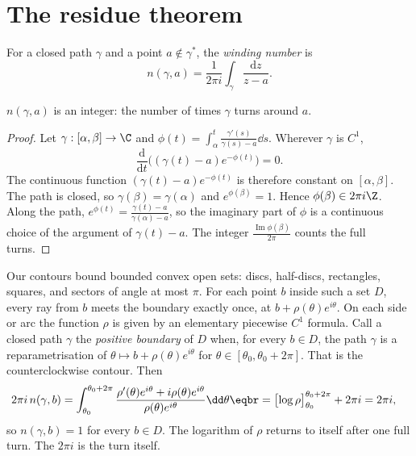 \section{The residue theorem}

For a closed path $\gamma$ and a point $a\notin\gamma^*$, the \emph{winding number} is
\[
n(\gamma,a)=\frac1{2\pi i}\int_\gamma\frac{\mathrm dz}{z-a}.
\]

\begin{proposition}\label{prop:winding}
$n(\gamma,a)$ is an integer: the number of times $\gamma$ turns around $a$.
\end{proposition}
\begin{proof}
Let $\gamma:[\alpha,\beta]\to\C$ and $\phi(t)=\int_\alpha^t\frac{\gamma'(s)}{\gamma(s)-a}\dd s$. Wherever $\gamma$ is $C^1$,
\[
\frac{\mathrm d}{\mathrm dt}\bigl((\gamma(t)-a)e^{-\phi(t)}\bigr)=0.
\]
The continuous function $(\gamma(t)-a)e^{-\phi(t)}$ is therefore constant on $[\alpha,\beta]$. The path is closed, so $\gamma(\beta)=\gamma(\alpha)$ and $e^{\phi(\beta)}=1$. Hence $\phi(\beta)\in2\pi i\Z$. Along the path, $e^{\phi(t)}=\frac{\gamma(t)-a}{\gamma(\alpha)-a}$, so the imaginary part of $\phi$ is a continuous choice of the argument of $\gamma(t)-a$. The integer $\frac{\operatorname{Im}\phi(\beta)}{2\pi}$ counts the full turns.
\end{proof}

Our contours bound bounded convex open sets: discs, half-discs, rectangles, squares, and sectors of angle at most $\pi$. For each point $b$ inside such a set $D$, every ray from $b$ meets the boundary exactly once, at $b+\rho(\theta)e^{i\theta}$. On each side or arc the function $\rho$ is given by an elementary piecewise $C^1$ formula. Call a closed path $\gamma$ the \emph{positive boundary} of $D$ when, for every $b\in D$, the path $\gamma$ is a reparametrisation of $\theta\mapsto b+\rho(\theta)e^{i\theta}$ for $\theta\in[\theta_0,\theta_0+2\pi]$. That is the counterclockwise contour. Then
\[
\begin{aligned}2\pi i\,n(\gamma,b)&=\int_{\theta_0}^{\theta_0+2\pi}\frac{\rho'(\theta)e^{i\theta}+i\rho(\theta)e^{i\theta}}{\rho(\theta)e^{i\theta}}\dd\theta\eqbr=\bigl[\log\rho\bigr]_{\theta_0}^{\theta_0+2\pi}+2\pi i=2\pi i,\end{aligned}
\]
so $n(\gamma,b)=1$ for every $b\in D$. The logarithm of $\rho$ returns to itself after one full turn. The $2\pi i$ is the turn itself.

